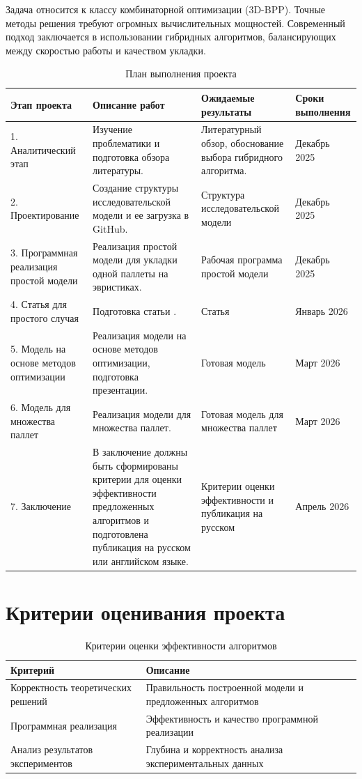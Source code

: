 Задача относится к классу комбинаторной оптимизации (3D-BPP). Точные методы решения требуют огромных вычислительных мощностей. Современный подход заключается в использовании гибридных алгоритмов, балансирующих между скоростью работы и качеством укладки.
\begin{table}[h!]
\centering
\caption{План выполнения проекта}
\label{tab:project_plan}
\begin{tabular}{|p{3cm}|p{6cm}|p{4cm}|p{3cm}|}
\hline
\textbf{Этап проекта} & \textbf{Описание работ} & \textbf{Ожидаемые результаты} & \textbf{Сроки выполнения} \\
\hline
1. Аналитический этап & Изучение проблематики и подготовка обзора литературы. & Литературный обзор, обоснование выбора гибридного алгоритма. & Декабрь 2025 \\
\hline
2. Проектирование & Создание структуры исследовательской модели и ее загрузка в GitHub. & Структура исследовательской модели & Декабрь 2025 \\
\hline
3. Программная реализация простой модели & Реализация простой модели для укладки одной паллеты на эвристиках. & Рабочая программа простой модели & Декабрь 2025 \\
\hline
4. Статья для простого  случая & Подготовка статьи . & Статья & Январь 2026 \\
\hline
5. Модель на основе методов оптимизации & Реализация модели на основе методов оптимизации, подготовка презентации. & Готовая модель & Март 2026 \\
\hline
6. Модель для множества паллет & Реализация модели для множества паллет. & Готовая модель для множества паллет & Март 2026 \\
\hline
7. Заключение & В заключение должны быть сформированы критерии для оценки эффективности предложенных алгоритмов и подготовлена публикация на русском или английском языке. & Критерии оценки эффективности и публикация на русском & Апрель 2026 \\
\hline
\end{tabular}
\end{table}

\chapter{Критерии оценивания проекта}
\begin{table}[h!]
\centering
\caption{Критерии оценки эффективности алгоритмов}
\label{tab:criteria}
\begin{tabular}{|p{4cm}|p{10cm}|}
\hline
\textbf{Критерий} & \textbf{Описание} \\
\hline
Корректность теоретических решений & Правильность построенной модели и предложенных алгоритмов \\
\hline
Программная реализация & Эффективность и качество программной реализации \\
\hline
Анализ результатов экспериментов & Глубина и корректность анализа экспериментальных данных \\
\hline
\end{tabular}
\end{table}
